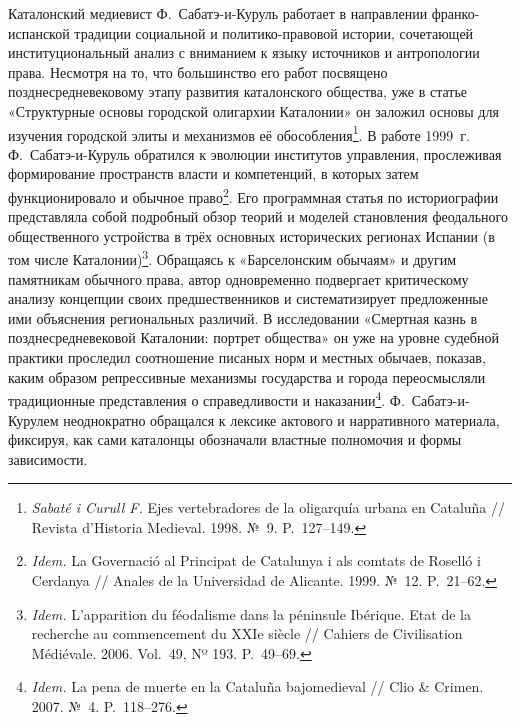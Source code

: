 Каталонский медиевист Ф.~Сабатэ-и-Куруль работает в направлении франко-испанской традиции социальной и политико-правовой истории, сочетающей институциональный анализ с вниманием к языку источников и антропологии права. Несмотря на то, что большинство его работ посвящено позднесредневековому этапу развития каталонского общества, уже в статье «Структурные основы городской олигархии Каталонии» он заложил основы для изучения городской элиты и механизмов её обособления\footnote{\emph{Sabaté i Curull F.} Ejes vertebradores de la oligarquía urbana en Cataluña // Revista d’Historia Medieval. 1998. №~9. P.~127--149.}. В работе 1999~г. Ф.~Сабатэ-и-Куруль обратился к эволюции институтов управления, прослеживая формирование пространств власти и компетенций, в которых затем функционировало и обычное право\footnote{\emph{Idem.} La Governació al Principat de Catalunya i als comtats de Roselló i Cerdanya // Anales de la Universidad de Alicante. 1999. №~12. P.~21--62.}. Его программная статья по историографии представляла собой подробный обзор теорий и моделей становления феодального общественного устройства в трёх основных исторических регионах Испании (в том числе Каталонии)\footnote{\emph{Idem.}  L'apparition du féodalisme dans la péninsule Ibérique. Etat de la recherche au commencement du XXIe siècle // Cahiers de Civilisation Médiévale. 2006. Vol.~49, Nº 193. P.~49--69.}. Обращаясь к «Барселонским обычаям» и другим памятникам обычного права, автор одновременно подвергает критическому анализу концепции своих предшественников и систематизирует предложенные ими объяснения региональных различий. В исследовании «Смертная казнь в позднесредневековой Каталонии: портрет общества» он уже на уровне судебной практики проследил соотношение писаных норм и местных обычаев, показав, каким образом репрессивные механизмы государства и города переосмысляли традиционные представления о справедливости и наказании\footnote{\emph{Idem.} La pena de muerte en la Cataluña bajomedieval // Clio \& Crimen. 2007. №~4. P.~118--276.}. Ф.~Сабатэ-и-Курулем неоднократно обращался к лексике актового и нарративного материала, фиксируя, как сами каталонцы обозначали властные полномочия и формы зависимости.

